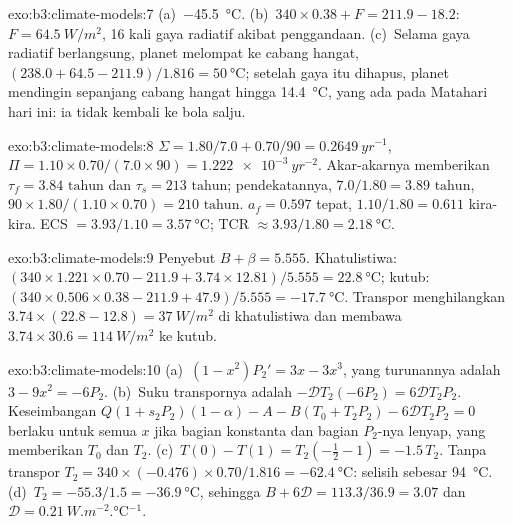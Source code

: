 \begin{solution}{exo:b3:climate-models:7}
(a)~\qty{-45.5}{\celsius}. (b)~$340\times0.38 + F = 211.9 - 18.2$: $F =
\qty{64.5}{W/m^2}$, 16 kali gaya radiatif akibat penggandaan. (c)~Selama
gaya radiatif berlangsung, planet melompat ke cabang hangat, $(238.0 + 64.5 -
211.9)/1.816 = \qty{50}{\celsius}$; setelah gaya itu dihapus, planet mendingin
sepanjang cabang hangat hingga \qty{14.4}{\celsius}, yang ada pada Matahari hari ini:
ia tidak kembali ke bola salju.
\end{solution}

\begin{solution}{exo:b3:climate-models:8}
$\Sigma = 1.80/7.0 + 0.70/90 = \qty{0.2649}{yr^{-1}}$, $\Pi = 1.10\times0.70/
(7.0\times90) = \qty{1.222e-3}{yr^{-2}}$. Akar-akarnya memberikan $\tau_f =
\num{3.84}\text{ tahun}$ dan $\tau_s = \num{213}\text{ tahun}$; pendekatannya,
$7.0/1.80 = \num{3.89}\text{ tahun}$, $90\times1.80/(1.10\times0.70) =
\num{210}\text{ tahun}$. $a_f = 0.597$ tepat, $1.10/1.80 = 0.611$
kira-kira. ECS $= 3.93/1.10 = \qty{3.57}{\celsius}$; TCR $\approx
3.93/1.80 = \qty{2.18}{\celsius}$.
\end{solution}

\begin{solution}{exo:b3:climate-models:9}
Penyebut $B + \beta = \num{5.555}$. Khatulistiwa: $(340\times1.221\times0.70 -
211.9 + 3.74\times12.81)/5.555 = \qty{22.8}{\celsius}$; kutub:
$(340\times0.506\times0.38 - 211.9 + 47.9)/5.555 = \qty{-17.7}{\celsius}$.
Transpor menghilangkan $3.74\times(22.8 - 12.8) = \qty{37}{W/m^2}$ di
khatulistiwa dan membawa $3.74\times30.6 = \qty{114}{W/m^2}$ ke kutub.
\end{solution}

\begin{solution}{exo:b3:climate-models:10}
(a)~$(1 - x^2)P_2' = 3x - 3x^3$, yang turunannya adalah $3 - 9x^2 = -6P_2$.
(b)~Suku transpornya adalah $-\mathcal D T_2(-6P_2) = 6\mathcal DT_2P_2$.
Keseimbangan $Q(1 + s_2P_2)(1 - \alpha) - A - B(T_0 + T_2P_2) - 6\mathcal
DT_2P_2 = 0$ berlaku untuk semua $x$ jika bagian konstanta dan bagian $P_2$-nya
lenyap, yang memberikan $T_0$ dan $T_2$. (c)~$T(0) - T(1) = T_2(-\tfrac12 - 1)
= -1.5\,T_2$. Tanpa transpor $T_2 = 340\times(-0.476)\times0.70/1.816 =
\qty{-62.4}{\celsius}$: selisih sebesar \qty{94}{\celsius}. (d)~$T_2 =
-55.3/1.5 = \qty{-36.9}{\celsius}$, sehingga $B + 6\mathcal D = 113.3/36.9 =
3.07$ dan $\mathcal D = \qty{0.21}{W.m^{-2}.\celsius^{-1}}$.
\end{solution}

